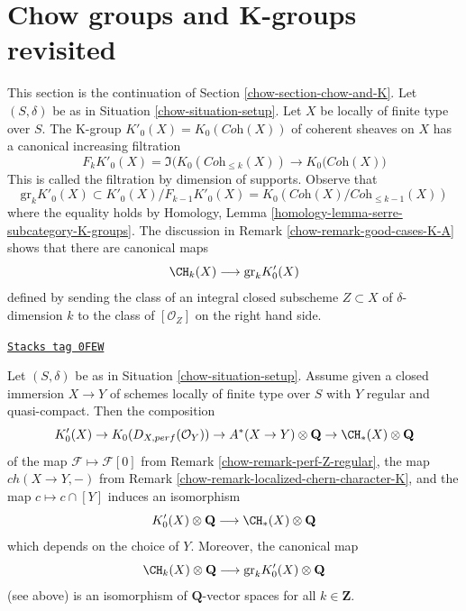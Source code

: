 \section{Chow groups and K-groups revisited}
\label{chow-section-chow-and-K-II}
This section is the continuation of Section \ref{chow-section-chow-and-K}.
Let $(S, \delta)$ be as in Situation \ref{chow-situation-setup}.
Let $X$ be locally of finite type over $S$. The K-group
$K'_0(X) = K_0(\textit{Coh}(X))$ of coherent sheaves on $X$
has a canonical increasing filtration
$$
F_kK'_0(X) =
\Im\Big(K_0(\textit{Coh}_{\leq k}(X)) \to K_0(\textit{Coh}(X)\Big)
$$
This is called the filtration by dimension of supports. Observe that
$$
\text{gr}_k K'_0(X) \subset K'_0(X)/F_{k - 1}K'_0(X) =
K_0(\textit{Coh}(X)/\textit{Coh}_{\leq k - 1}(X))
$$
where the equality holds
by Homology, Lemma \ref{homology-lemma-serre-subcategory-K-groups}.
The discussion in Remark \ref{chow-remark-good-cases-K-A} shows
that there are canonical maps
$$
\CH_k(X) \longrightarrow \text{gr}_k K'_0(X)
$$
defined by sending the class of an integral closed subscheme
$Z \subset X$ of $\delta$-dimension $k$ to the class of
$[\mathcal{O}_Z]$ on the right hand side.

\begin{proposition}[K tensor Q]
\label{chow-proposition-K-tensor-Q}
\href{https://stacks.math.columbia.edu/tag/0FEW}{\texttt{Stacks tag 0FEW}}

Let $(S, \delta)$ be as in Situation \ref{chow-situation-setup}. Assume given a
closed immersion $X \to Y$ of schemes locally of finite type over $S$
with $Y$ regular and quasi-compact. Then the composition
$$
K'_0(X) \to
K_0(D_{X, perf}(\mathcal{O}_Y)) \to
A^*(X \to Y) \otimes \mathbf{Q} \to
\CH_*(X) \otimes \mathbf{Q}
$$
of the map $\mathcal{F} \mapsto \mathcal{F}[0]$ from
Remark \ref{chow-remark-perf-Z-regular}, the map $ch(X \to Y, -)$ from
Remark \ref{chow-remark-localized-chern-character-K}, and
the map $c \mapsto c \cap [Y]$ induces an isomorphism
$$
K'_0(X) \otimes \mathbf{Q}
\longrightarrow
\CH_*(X) \otimes \mathbf{Q}
$$
which depends on the choice of $Y$. Moreover, the canonical map
$$
\CH_k(X) \otimes \mathbf{Q}
\longrightarrow
\text{gr}_k K'_0(X) \otimes \mathbf{Q}
$$
(see above) is an isomorphism of $\mathbf{Q}$-vector spaces for all
$k \in \mathbf{Z}$.
\end{proposition}

